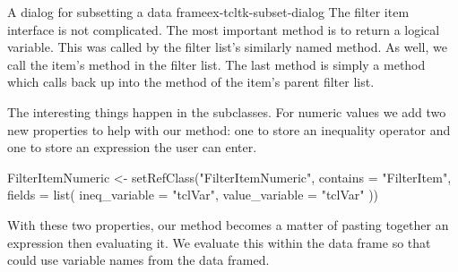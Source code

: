 \begin{example}{A dialog for subsetting a data frame}{ex-tcltk-subset-dialog}
The filter item interface is not complicated. The most important method
is  to return a logical variable. This was called by
the filter list's similarly named  method. As well,
we call the item's  method in the filter list. The
last method is simply a  method which calls back up into the
 method of the item's parent filter list.

\begin{Schunk}
\end{Schunk}

The interesting things happen in the subclasses. For numeric values we
add two new properties to help with our  method: one
to store an inequality operator and one to store an expression the
user can enter.
\begin{Schunk}
\begin{Sinput}
 FilterItemNumeric <- setRefClass("FilterItemNumeric",
                                  contains = "FilterItem",
                                  fields = list(
                                    ineq_variable = "tclVar",
                                    value_variable = "tclVar"
                                    ))
\end{Sinput}
\end{Schunk}
%

With these two properties, our  method becomes a
matter of pasting together an expression then evaluating it. We
evaluate this within the data frame so that  could use
variable names from the data framed. 
\begin{Schunk}
\end{Schunk}
\end{example}
